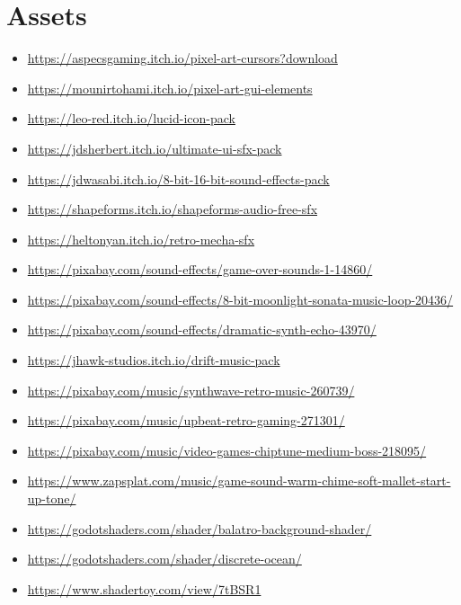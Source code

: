 \nocite{*}



\section*{Assets}
\begin{itemize}
\item \url{https://aspecsgaming.itch.io/pixel-art-cursors?download}
\item \url{https://mounirtohami.itch.io/pixel-art-gui-elements}
\item \url{https://leo-red.itch.io/lucid-icon-pack}
\item \url{https://jdsherbert.itch.io/ultimate-ui-sfx-pack}
\item \url{https://jdwasabi.itch.io/8-bit-16-bit-sound-effects-pack}
\item \url{https://shapeforms.itch.io/shapeforms-audio-free-sfx}
\item \url{https://heltonyan.itch.io/retro-mecha-sfx}
\item \url{https://pixabay.com/sound-effects/game-over-sounds-1-14860/}
\item \url{https://pixabay.com/sound-effects/8-bit-moonlight-sonata-music-loop-20436/}
\item \url{https://pixabay.com/sound-effects/dramatic-synth-echo-43970/}
\item \url{https://jhawk-studios.itch.io/drift-music-pack}
\item \url{https://pixabay.com/music/synthwave-retro-music-260739/}
\item \url{https://pixabay.com/music/upbeat-retro-gaming-271301/}
\item \url{https://pixabay.com/music/video-games-chiptune-medium-boss-218095/}
\item \url{https://www.zapsplat.com/music/game-sound-warm-chime-soft-mallet-start-up-tone/}
\item \url{https://godotshaders.com/shader/balatro-background-shader/}
\item \url{https://godotshaders.com/shader/discrete-ocean/}
\item \url{https://www.shadertoy.com/view/7tBSR1}
\end{itemize}
